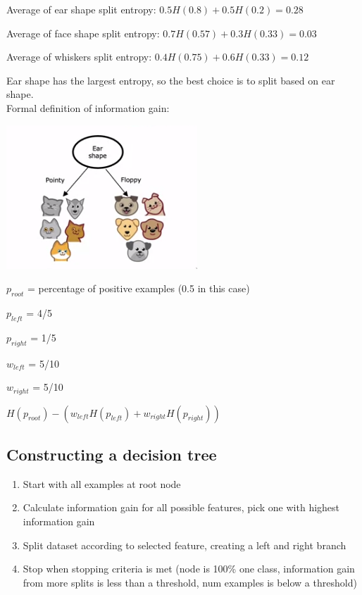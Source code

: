 \documentclass[12pt]{article}
\begin{document}
Average of ear shape split entropy: $0.5 H(0.8) + 0.5 H(0.2) = 0.28$

Average of face shape split entropy: $0.7 H(0.57) + 0.3 H(0.33) = 0.03$

Average of whiskers split entropy: $0.4 H(0.75) + 0.6 H(0.33) = 0.12$

Ear shape has the largest entropy, so the best choice is to split based on ear shape.\\

Formal definition of information gain:

\includegraphics{information-gain}

$p_{root}$ = percentage of positive examples (0.5 in this case)

$p_{left}$ = 4/5

$p_{right}$ = 1/5

$w_{left}$ = 5/10

$w_{right}$ = 5/10

$H(p_{root}) - (w_{left} H(p_{left}) + w_{right} H(p_{right}))$

\subsection{Constructing a decision tree}

\begin{enumerate}
    \item Start with all examples at root node
    \item Calculate information gain for all possible features, pick one with highest information gain
    \item Split dataset according to selected feature, creating a left and right branch
    \item Stop when stopping criteria is met (node is 100\% one class, information gain
        from more splits is less than a threshold, num examples is below a threshold)
\end{enumerate}
\end{document}
